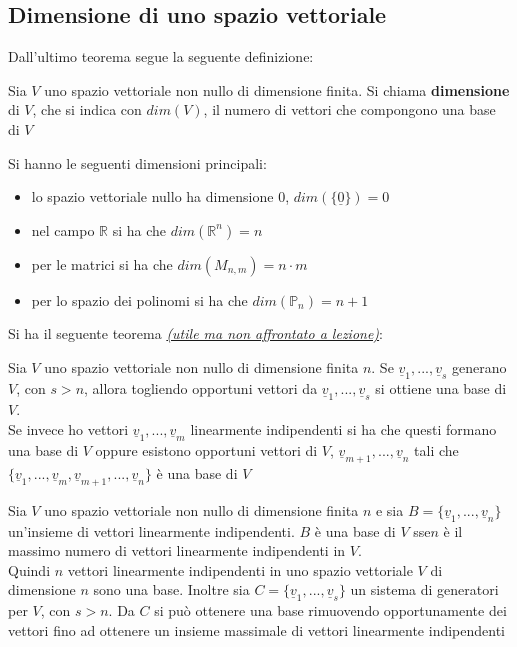 \documentclass[a4paper,12pt, oneside]{book}
\begin{document}
\subsection{Dimensione di uno spazio vettoriale}
Dall'ultimo teorema segue la seguente definizione:
\begin{definizione}
	Sia $V$ uno spazio vettoriale non nullo di dimensione finita. Si chiama \textbf{dimensione} di $V$, che si indica con $dim(V)$, il numero di vettori che compongono una base di $V$
\end{definizione}
Si hanno le seguenti dimensioni principali:
\begin{itemize}
	\item lo spazio vettoriale nullo ha dimensione 0, $dim(\{\underline{0}\})=0$
	\item nel campo $\mathbb{R}$ si ha che $dim(\mathbb{R}^n)=n$
	\item per le matrici si ha che $dim(M_{n,m})=n\cdot m$
	\item per lo spazio dei polinomi si ha che $dim (\mathbb{P}_n)=n+1$
\end{itemize}
\begin{shaded}
	Si ha il seguente teorema \textit{\underline{(utile ma non affrontato a lezione)}}:
	\begin{teorema}
		Sia $V$ uno spazio vettoriale non nullo di dimensione finita $n$. Se $\underline{v}_1,...,\underline{v}_s$ generano $V$, con $s>n$, allora togliendo opportuni vettori da $\underline{v}_1,...,\underline{v}_s$ si ottiene una base di $V$.\\
		Se invece ho vettori $\underline{v}_1,...,\underline{v}_m$ linearmente indipendenti si ha che questi formano una base di $V$ oppure esistono opportuni vettori di $V$, $\underline{v}_{m+1},...,\underline{v}_n$ tali che $\{\underline{v}_1,...,\underline{v}_m,\underline{v}_{m+1},...,\underline{v}_n\}$ è una base di $V$
	\end{teorema}
\end{shaded}
\begin{teorema}
	Sia $V$ uno spazio vettoriale non nullo di dimensione finita $n$ e sia $B=\{\underline{v}_1,...,\underline{v}_n\}$ un'insieme di vettori linearmente indipendenti. $B$ è una base di $V$ sse$n$ è il massimo numero di vettori linearmente indipendenti in $V$.\\
	Quindi $n$ vettori linearmente indipendenti in uno spazio vettoriale $V$ di dimensione $n$ sono una base. Inoltre sia $C=\{\underline{v}_1,...,\underline{v}_s\}$ un sistema di generatori per $V$, con $s>n$. Da $C$ si può ottenere una base rimuovendo opportunamente dei vettori fino ad ottenere un insieme massimale di vettori linearmente indipendenti
\end{teorema}
\end{document}
